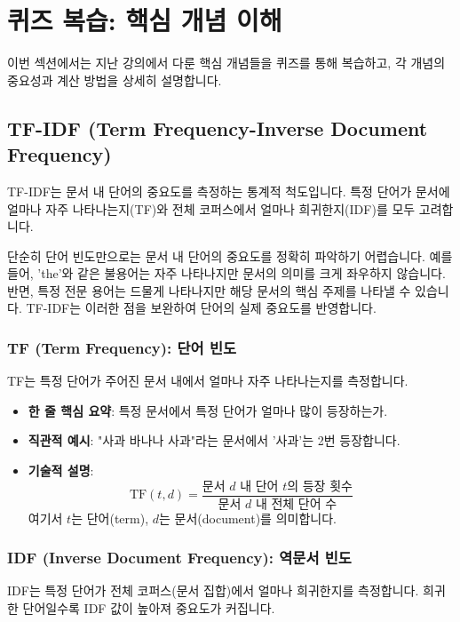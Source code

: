 \documentclass[11pt,a4paper]{article}
\theoremstyle{definition}
\begin{document}
\newpage
\section{퀴즈 복습: 핵심 개념 이해}
이번 섹션에서는 지난 강의에서 다룬 핵심 개념들을 퀴즈를 통해 복습하고, 각 개념의 중요성과 계산 방법을 상세히 설명합니다.

\subsection{TF-IDF (Term Frequency-Inverse Document Frequency)}
TF-IDF는 문서 내 단어의 중요도를 측정하는 통계적 척도입니다. 특정 단어가 문서에 얼마나 자주 나타나는지(TF)와 전체 코퍼스에서 얼마나 희귀한지(IDF)를 모두 고려합니다.

\begin{infobox}
단순히 단어 빈도만으로는 문서 내 단어의 중요도를 정확히 파악하기 어렵습니다. 예를 들어, 'the'와 같은 불용어는 자주 나타나지만 문서의 의미를 크게 좌우하지 않습니다. 반면, 특정 전문 용어는 드물게 나타나지만 해당 문서의 핵심 주제를 나타낼 수 있습니다. TF-IDF는 이러한 점을 보완하여 단어의 실제 중요도를 반영합니다.
\end{infobox}

\subsubsection{TF (Term Frequency): 단어 빈도}
TF는 특정 단어가 주어진 문서 내에서 얼마나 자주 나타나는지를 측정합니다.

\begin{itemize}
    \item \textbf{한 줄 핵심 요약}: 특정 문서에서 특정 단어가 얼마나 많이 등장하는가.
    \item \textbf{직관적 예시}: "사과 바나나 사과"라는 문서에서 '사과'는 2번 등장합니다.
    \item \textbf{기술적 설명}:
        \begin{equation*}
        \text{TF}(t, d) = \frac{\text{문서 } d \text{ 내 단어 } t \text{의 등장 횟수}}{\text{문서 } d \text{ 내 전체 단어 수}}
        \end{equation*}
        여기서 $t$는 단어(term), $d$는 문서(document)를 의미합니다.
\end{itemize}

\subsubsection{IDF (Inverse Document Frequency): 역문서 빈도}
IDF는 특정 단어가 전체 코퍼스(문서 집합)에서 얼마나 희귀한지를 측정합니다. 희귀한 단어일수록 IDF 값이 높아져 중요도가 커집니다.
\end{document}
